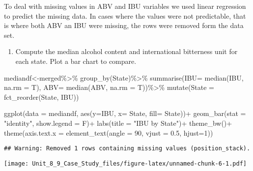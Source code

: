 \documentclass[
]{article}
\newenvironment{Shaded}{\begin{snugshade}}{\end{snugshade}}
\newcommand{\AttributeTok}[1]{\textcolor[rgb]{0.77,0.63,0.00}{#1}}
\newcommand{\DecValTok}[1]{\textcolor[rgb]{0.00,0.00,0.81}{#1}}
\newcommand{\FloatTok}[1]{\textcolor[rgb]{0.00,0.00,0.81}{#1}}
\newcommand{\FunctionTok}[1]{\textcolor[rgb]{0.00,0.00,0.00}{#1}}
\newcommand{\NormalTok}[1]{#1}
\newcommand{\OtherTok}[1]{\textcolor[rgb]{0.56,0.35,0.01}{#1}}
\newcommand{\SpecialCharTok}[1]{\textcolor[rgb]{0.00,0.00,0.00}{#1}}
\newcommand{\StringTok}[1]{\textcolor[rgb]{0.31,0.60,0.02}{#1}}
\providecommand{\tightlist}{%
  \setlength{\itemsep}{0pt}\setlength{\parskip}{0pt}}
\begin{document}
To deal with missing values in ABV and IBU variables we used linear
regression to predict the missing data. In cases where the values were
not predictable, that is where both ABV an IBU were missing, the rows
were removed form the data set.

\begin{enumerate}
\def\labelenumi{\arabic{enumi}.}
\setcounter{enumi}{3}
\tightlist
\item
  Compute the median alcohol content and international bitterness unit
  for each state. Plot a bar chart to compare.
\end{enumerate}

\begin{Shaded}
\begin{Highlighting}[]
\NormalTok{mediandf}\OtherTok{\textless{}{-}}\NormalTok{merged}\SpecialCharTok{\%\textgreater{}\%}
  \FunctionTok{group\_by}\NormalTok{(State)}\SpecialCharTok{\%\textgreater{}\%}
  \FunctionTok{summarise}\NormalTok{(}\AttributeTok{IBU=} \FunctionTok{median}\NormalTok{(IBU, }\AttributeTok{na.rm =}\NormalTok{ T), }\AttributeTok{ABV=} \FunctionTok{median}\NormalTok{(ABV, }\AttributeTok{na.rm =}\NormalTok{ T))}\SpecialCharTok{\%\textgreater{}\%}
  \FunctionTok{mutate}\NormalTok{(}\AttributeTok{State =} \FunctionTok{fct\_reorder}\NormalTok{(State, IBU)) }

\FunctionTok{ggplot}\NormalTok{(}\AttributeTok{data =}\NormalTok{ mediandf, }\FunctionTok{aes}\NormalTok{(}\AttributeTok{y=}\NormalTok{IBU, }\AttributeTok{x=}\NormalTok{ State, }\AttributeTok{fill=}\NormalTok{ State))}\SpecialCharTok{+}
  \FunctionTok{geom\_bar}\NormalTok{(}\AttributeTok{stat =} \StringTok{"identity"}\NormalTok{, }\AttributeTok{show.legend =}\NormalTok{ F)}\SpecialCharTok{+}
  \FunctionTok{labs}\NormalTok{(}\AttributeTok{title =} \StringTok{"IBU by State"}\NormalTok{)}\SpecialCharTok{+}
  \FunctionTok{theme\_bw}\NormalTok{()}\SpecialCharTok{+}
  \FunctionTok{theme}\NormalTok{(}\AttributeTok{axis.text.x =} \FunctionTok{element\_text}\NormalTok{(}\AttributeTok{angle =} \DecValTok{90}\NormalTok{, }\AttributeTok{vjust =} \FloatTok{0.5}\NormalTok{, }\AttributeTok{hjust=}\DecValTok{1}\NormalTok{))}
\end{Highlighting}
\end{Shaded}

\begin{verbatim}
## Warning: Removed 1 rows containing missing values (position_stack).
\end{verbatim}

\texttt{[image: Unit\_8\_9\_Case\_Study\_files/figure-latex/unnamed-chunk-6-1.pdf]}
\end{document}
